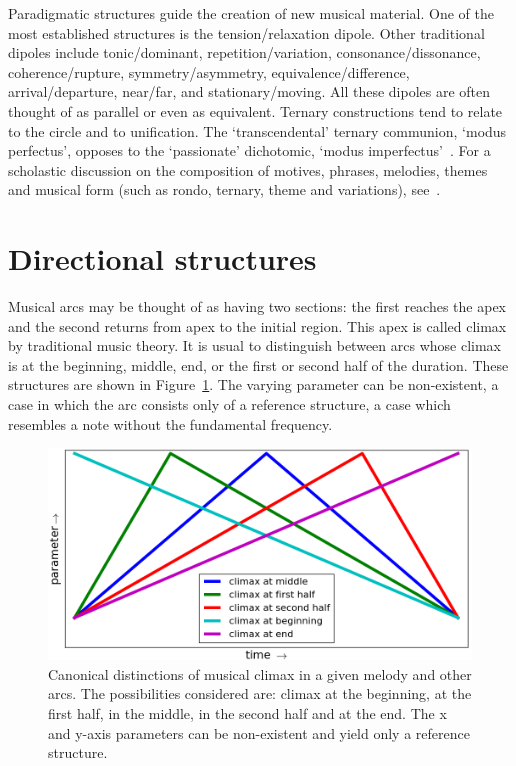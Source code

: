 \documentclass[format=acmsmall, review=false, screen=true]{acmart}
\begin{document}
Paradigmatic structures guide the creation of new musical material.
One of the most established structures is the tension/relaxation dipole.
Other traditional dipoles include tonic/dominant, repetition/variation,
consonance/dissonance, coherence/rupture, symmetry/asymmetry,
equivalence/difference, arrival/departure, near/far, and stationary/moving.
All these dipoles are often thought of as parallel or even as equivalent.
Ternary constructions tend to relate to the circle and to unification. The
`transcendental' ternary communion, `modus perfectus', opposes to the `passionate'
dichotomic, `modus imperfectus'~\cite{apel}.
For a scholastic discussion on the composition of motives,
phrases, melodies, themes and musical form (such as rondo, ternary, theme and variations), see~\cite{Schoenberg}.

\section{Directional structures}\label{subsec:dir}
Musical arcs may be thought of as having two sections: the first reaches the apex and the second returns from apex to the initial region.
This apex is called climax by traditional music theory. It is
usual to distinguish between arcs whose climax is at the beginning, middle, end,
or the first or second half of the duration. These structures are
shown in Figure~\ref{fig:climax}. The varying parameter can be non-existent, a case in which
the arc consists only of a reference structure, a case which resembles a note without the fundamental frequency.~\cite{Schoenberg}

\begin{figure}
    \centering
        \includegraphics[width=.8\columnwidth]{figures/climax_}
        \caption{Canonical distinctions of musical climax in a given melody and
        other arcs. The possibilities considered are: climax at the beginning, at the first half, in the middle, in the second half and 
        at the end. The x and y-axis parameters can be non-existent and yield only a reference structure.}
        \label{fig:climax}
\end{figure}
\end{document}
